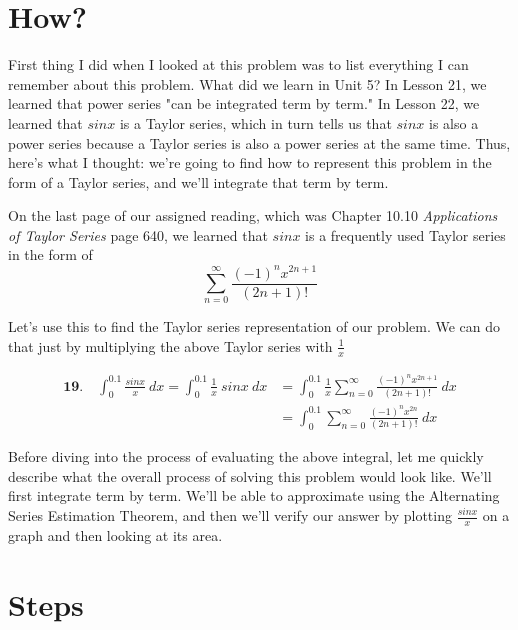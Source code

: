 
\section*{How?}

First thing I did when I looked at this
problem was to list everything I can remember
about this problem. What did we learn in Unit 5?
In Lesson 21, we learned that power series
"can be integrated term by term." In Lesson 22, 
we learned that $ sinx $ is a Taylor series, 
which in turn tells us that $ sinx $
is also a power series
because a Taylor
series is also a power series at the same time.
Thus, here's what I thought: we're going to
find how to represent
this problem in the form
of a Taylor series, and
we'll integrate that
term by term.

On the last page of our assigned reading,
which was Chapter 10.10
\textit{Applications of Taylor Series} page 640,
we learned that $ sinx $
is a frequently used
Taylor series in the
form of 
\begin{equation}
	\sum_{n=0}^{\infty}
	\frac{
		(-1)^nx^{2n+1}
	}{
		(2n+1)!
	}
\end{equation}

Let's use this to
find the Taylor series
representation of
our problem. We can
do that just by 
multiplying the above
Taylor series with 
$ \frac{1}{x} $

\begin{align}
	\textbf{19.}\quad \int_{0}^{0.1} 
	\frac{sinx}{x}\ dx
	=
    \int_{0}^{0.1} 
	\frac{1}{x}\ 
	sinx\ dx
	&=
	\int_{0}^{0.1}
	\frac{1}{x}
	\sum_{n=0}^{\infty}
	\frac{
		(-1)^nx^{2n+1}
	}{
		(2n+1)!
	}\ dx \\
    &=
   	\int_{0}^{0.1}
	\sum_{n=0}^{\infty}
	\frac{
		(-1)^nx^{2n}
	}{
		(2n+1)!
	}\ dx
\end{align}

Before diving into
the process of evaluating
the above integral,
let me quickly describe
what the overall process
of solving this problem would
look like. We'll first 
integrate term by term.
We'll be able to
approximate using
the Alternating Series
Estimation Theorem, and then
we'll verify our answer
by plotting $ \frac{sinx}{x} $
on a graph and then looking
at its area.

\newpage

\section*{Steps}

